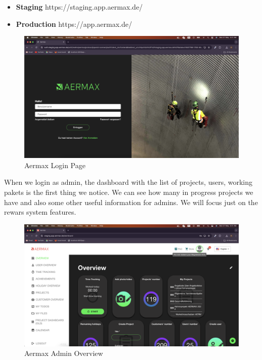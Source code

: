 \begin{itemize}
  \item \textbf{Staging} https://staging.app.aermax.de/
  \item \textbf{Production} https://app.aermax.de/

\end{itemize}


\begin{figure}[H]
  \centering
  \includegraphics[width=1\textwidth]{src/assets/chapters/login.png}
  \caption{Aermax Login Page}
  \label{fig:login}
\end{figure}

When we login as admin, the dashboard with the list of projects, users, working pakets is the first thing
we notice. We can see how many in progress projects we have and
also some other useful information for admins.
We will focus just on the rewars system features.

\begin{figure}[H]
  \centering
  \includegraphics[width=1\textwidth]{src/assets/chapters/adminOverview.png}
  \caption{Aermax Admin Overview}
  \label{fig:admin-overview}
\end{figure}

